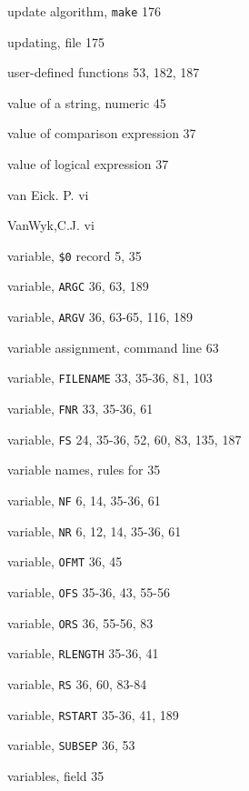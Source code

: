 \begin{multicols}{3}
\hangindent=3pc  update algorithm, \verb'make' 176

\hangindent=3pc  updating, file 175

\hangindent=3pc  user-defined functions 53, 182,  187

\hangindent=3pc  value of a string, numeric 45

\hangindent=3pc  value of comparison expression 37

\hangindent=3pc  value of logical expression 37

\hangindent=3pc  van Eick. P. vi

\hangindent=3pc  VanWyk,C.J. vi

\hangindent=3pc  variable, \verb'$0' record 5, 35

\hangindent=3pc  variable, \verb'ARGC' 36, 63, 189

\hangindent=3pc  variable, \verb'ARGV' 36, 63-65, 116, 189

\hangindent=3pc  variable assignment, command line 63

\hangindent=3pc  variable, \verb'FILENAME' 33, 35-36, 81, 103

\hangindent=3pc  variable, \verb'FNR' 33, 35-36, 61

\hangindent=3pc  variable, \verb'FS' 24, 35-36, 52, 60, 83, 135, 187

\hangindent=3pc  variable names, rules for 35

\hangindent=3pc  variable, \verb'NF' 6, 14, 35-36, 61

\hangindent=3pc  variable, \verb'NR' 6, 12, 14, 35-36, 61

\hangindent=3pc  variable, \verb'OFMT' 36, 45

\hangindent=3pc  variable, \verb'OFS' 35-36, 43, 55-56

\hangindent=3pc  variable, \verb'ORS' 36, 55-56, 83

\hangindent=3pc  variable, \verb'RLENGTH' 35-36, 41

\hangindent=3pc  variable, \verb'RS' 36, 60, 83-84

\hangindent=3pc  variable, \verb'RSTART' 35-36, 41, 189

\hangindent=3pc  variable, \verb'SUBSEP' 36, 53

\hangindent=3pc  variables, field 35


\end{multicols}
